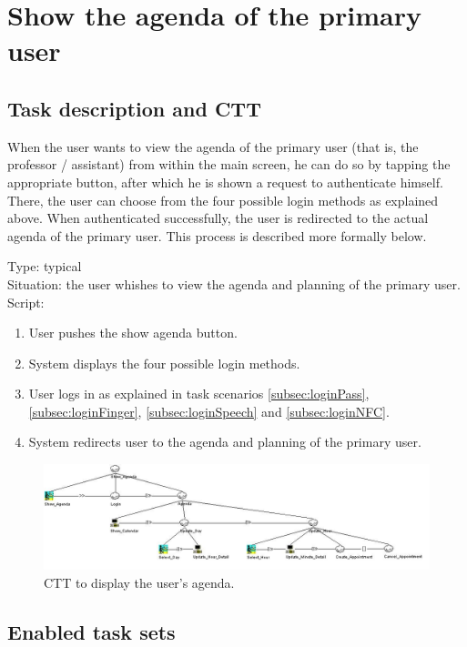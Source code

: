 \documentclass[11pt, a4paper,svglistings]{report}
\begin{document}
\section{Show the agenda of the primary user}

\subsection{Task description and CTT}

When the user wants to view the agenda of the primary user (that is, the professor / assistant) from within the main screen, he can do so by tapping the appropriate button, after which he is shown a request to authenticate himself. There, the user can choose from the four possible login methods as explained above. When authenticated successfully, the user is redirected to the actual agenda of the primary user. This process is described more formally below.

\label{subsec:agenda}Type: typical \\
Situation: the user whishes to view  the agenda and planning of the primary user. \\
Script:
\begin{enumerate}
\item User pushes the show agenda button.
\item System displays the four possible login methods.
\item User logs in as explained in task scenarios \ref{subsec:loginPass}, \ref{subsec:loginFinger}, \ref{subsec:loginSpeech} and \ref{subsec:loginNFC}.
\item System redirects user to the agenda and planning of the primary user.
\end{enumerate}

\begin{figure}[H]
\centering
    \includegraphics[width=1\textwidth]{ShowAgenda.jpg}
  \caption[Display agenda CTT]{\label{fig:ShowAgenda}CTT to display the user's agenda.}
\end{figure}

\subsection{Enabled task sets}
\end{document}
